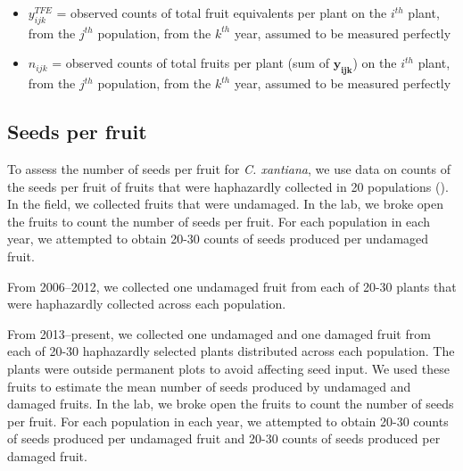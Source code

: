 \documentclass[12pt, oneside, titlepage]{article}   	%
\begin{document}
\begin{itemize}

	\item $y^{TFE}_{ijk}$ = observed counts of total fruit equivalents per plant on the $i^{th}$ plant, from the $j^{th}$ population, from the $k^{th}$ year, assumed to be measured perfectly
	\item $n_{ijk}$ = observed counts of total fruits per plant (sum of $\bm{y_{ijk}}$) on the $i^{th}$ plant, from the $j^{th}$ population, from the $k^{th}$ year, assumed to be measured perfectly
\end{itemize}

\subsection{Seeds per fruit}

To assess the number of seeds per fruit for \textit{C. xantiana}, we use data on counts of the seeds per fruit of fruits that were haphazardly collected in 20 populations (\cite{eckhart2011}). In the field, we collected fruits that were undamaged. In the lab, we broke open the fruits to count the number of seeds per fruit. For each population in each year, we attempted to obtain 20-30 counts of seeds produced per undamaged fruit. 

From 2006--2012, we collected one undamaged fruit from each of 20-30 plants that were haphazardly collected across each population.

From 2013--present, we collected one undamaged and one damaged fruit from each of 20-30 haphazardly selected plants distributed across each population. The plants were outside permanent plots to avoid affecting seed input. We used these fruits to estimate the mean number of seeds produced by undamaged and damaged fruits. In the lab, we broke open the fruits to count the number of seeds per fruit. For each population in each year, we attempted to obtain 20-30 counts of seeds produced per undamaged fruit and  20-30 counts of seeds produced per damaged fruit. 
\end{document}
